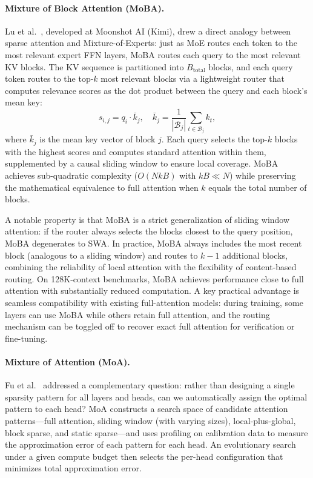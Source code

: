 \paragraph{Mixture of Block Attention (MoBA).}
Lu et al.~\cite{lu2025moba}, developed at Moonshot AI (Kimi), drew a direct analogy between sparse attention and Mixture-of-Experts: just as MoE routes each token to the most relevant expert FFN layers, MoBA routes each query to the most relevant KV blocks. The KV sequence is partitioned into $B_{\text{total}}$ blocks, and each query token routes to the top-$k$ most relevant blocks via a lightweight router that computes relevance scores as the dot product between the query and each block's mean key:
\begin{equation}
s_{i,j} = q_i \cdot \bar{k}_j, \quad \bar{k}_j = \frac{1}{|\mathcal{B}_j|}\sum_{t \in \mathcal{B}_j} k_t,
\label{eq:moba-router}
\end{equation}
where $\bar{k}_j$ is the mean key vector of block $j$. Each query selects the top-$k$ blocks with the highest scores and computes standard attention within them, supplemented by a causal sliding window to ensure local coverage. MoBA achieves sub-quadratic complexity ($O(NkB)$ with $kB \ll N$) while preserving the mathematical equivalence to full attention when $k$ equals the total number of blocks.

A notable property is that MoBA is a strict generalization of sliding window attention: if the router always selects the blocks closest to the query position, MoBA degenerates to SWA. In practice, MoBA always includes the most recent block (analogous to a sliding window) and routes to $k - 1$ additional blocks, combining the reliability of local attention with the flexibility of content-based routing. On 128K-context benchmarks, MoBA achieves performance close to full attention with substantially reduced computation. A key practical advantage is seamless compatibility with existing full-attention models: during training, some layers can use MoBA while others retain full attention, and the routing mechanism can be toggled off to recover exact full attention for verification or fine-tuning.

\paragraph{Mixture of Attention (MoA).}
Fu et al.~\cite{fu2024moa} addressed a complementary question: rather than designing a single sparsity pattern for all layers and heads, can we automatically assign the optimal pattern to each head? MoA constructs a search space of candidate attention patterns---full attention, sliding window (with varying sizes), local-plus-global, block sparse, and static sparse---and uses profiling on calibration data to measure the approximation error of each pattern for each head. An evolutionary search under a given compute budget then selects the per-head configuration that minimizes total approximation error.


